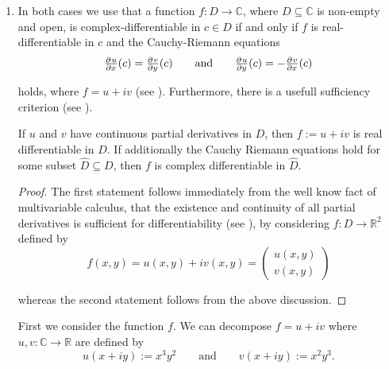 \begin{enumerate}[label = \textbf{Exercise \arabic*.},wide = 0pt, itemsep=1.5ex]
	\begin{proof}
		$h$ aswell as $h^{-1}$ are well-defined rational functions, hence holomorphic in their respective domains.		
	\end{proof}
	
	By lemma \ref{lem:well_defined}, \ref{lem:invertible} and \ref{lem:holo} we conclude that the Cayley-map is biholomorphic. 

\item In both cases we use that a function $f: D \to \mathbb{C}$, where $D \subseteq \mathbb{C}$ is non-empty and open, is complex-differentiable in $c \in D$ if and only if $f$ is real-differentiable in $c$ and the Cauchy-Riemann equations 
	\begin{equation*}
		\pd{u}{x}(c) = \pd{v}{y}(c) \qquad \text{and} \qquad \pd{u}{y}(c) = -\pd{v}{x}(c)
	\end{equation*}

	\noindent holds, where $f = u + iv$ (see \cite[47]{remmert2002funktionentheorie}). Furthermore, there is a usefull sufficiency criterion (see \cite[48]{remmert2002funktionentheorie}).	
	\begin{lemma}
		If $u$ and $v$ have continuous partial derivatives in $D$, then $f := u + iv$ is real differentiable in $D$. If additionally the Cauchy Riemann equations hold for some subset $\hat{D} \subseteq D$, then $f$ is complex differentiable in $\hat{D}$.
	\end{lemma}

	\begin{proof}
		The first statement follows immediately from the well know fact of multivariable calculus, that the existence and continuity of all partial derivatives is sufficient for differentiability (see \cite[457]{zorich:analysis_I:2004}), by considering $f: D \to \mathbb{R}^2$ defined by 
		\begin{equation*}
			f(x,y) = u(x,y) + iv(x,y) = \begin{pmatrix}
				u(x,y)\\
				v(x,y)
			\end{pmatrix}
		\end{equation*}
	
		\noindent whereas the second statement follows from the above discussion.
	\end{proof}

	First we consider the function $f$. We can decompose $f = u + iv$ where $u,v: \mathbb{C} \to \mathbb{R}$ are defined by
	\begin{equation}
		u(x + iy) := x^3y^2 \qquad \text{and} \qquad v(x + iy) := x^2y^3.	
	\end{equation}


\end{enumerate}
